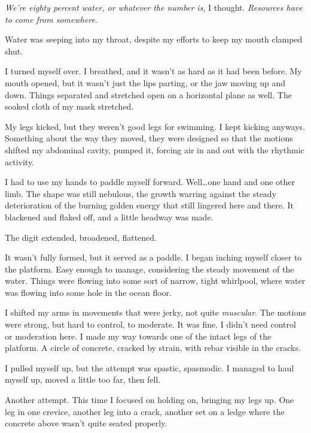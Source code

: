 \emph{We're eighty percent water, or whatever the number is}, I thought.  \emph{Resources have to come from somewhere}.



Water was seeping into my throat, despite my efforts to keep my mouth clamped shut.



I turned myself over.  I breathed, and it wasn't as hard as it had been before.  My mouth opened, but it wasn't just the lips parting, or the jaw moving up and down.  Things separated and stretched open on a horizontal plane as well.  The soaked cloth of my mask stretched.



My legs kicked, but they weren't good legs for swimming.  I kept kicking anyways.  Something about the way they moved, they were designed so that the motions shifted my abdominal cavity, pumped it, forcing air in and out with the rhythmic activity.



I had to use my hands to paddle myself forward.  Well\ldots one hand and one other limb.  The shape was still nebulous, the growth warring against the steady deterioration of the burning golden energy that still lingered here and there.  It blackened and flaked off, and a little headway was made.



The digit extended, broadened, flattened.



It wasn't fully formed, but it served as a paddle.  I began inching myself closer to the platform.  Easy enough to manage, considering the steady movement of the water.  Things were flowing into some sort of narrow, tight whirlpool, where water was flowing into some hole in the ocean floor.



I shifted my arms in movements that were jerky, not quite \emph{muscular}.  The motions were strong, but hard to control, to moderate.  It was fine.  I didn't need control or moderation here.  I made my way towards one of the intact legs of the platform.  A circle of concrete, cracked by strain, with rebar visible in the cracks.



I pulled myself up, but the attempt was spastic, spasmodic.  I managed to haul myself up, moved a little too far, then fell.



Another attempt.  This time I focused on holding on, bringing my legs up.  One leg in one crevice, another leg into a crack, another set on a ledge where the concrete above wasn't quite seated properly.



